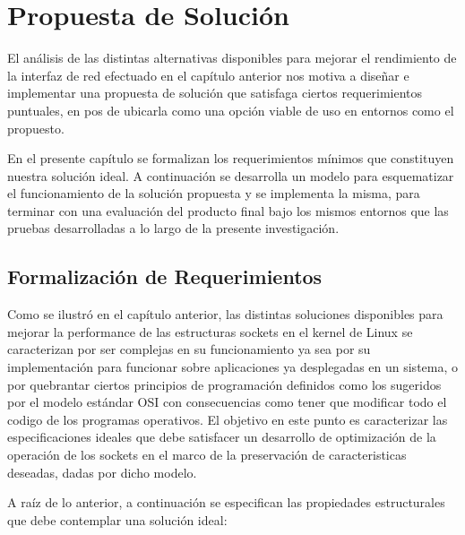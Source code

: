 \chapter{Propuesta de Solución}
El análisis de las distintas alternativas disponibles para mejorar el rendimiento de la interfaz de red efectuado en el capítulo anterior nos motiva a diseñar e implementar una propuesta de solución que satisfaga ciertos requerimientos puntuales, en pos de ubicarla como una opción viable de uso en entornos como el propuesto.

En el presente capítulo se formalizan los requerimientos mínimos que constituyen nuestra solución ideal. A continuación se desarrolla un modelo para esquematizar el funcionamiento de la solución propuesta y se implementa la misma, para terminar con una evaluación del producto final bajo los mismos entornos que las pruebas desarrolladas a lo largo de la presente investigación.

\section{Formalización de Requerimientos}
Como se ilustró en el capítulo anterior, las distintas soluciones disponibles para mejorar la performance de las estructuras sockets en el kernel de Linux se caracterizan por ser complejas en su funcionamiento ya sea por su implementación para funcionar sobre aplicaciones ya desplegadas en un sistema, o por quebrantar ciertos principios de programación definidos como los sugeridos por el modelo estándar OSI con consecuencias como tener que modificar todo el codigo de los programas operativos. El objetivo en este punto es caracterizar las especificaciones ideales que debe satisfacer un desarrollo de optimización de la operación de los sockets en el marco de la preservación de caracteristicas deseadas, dadas por dicho modelo.

A raíz de lo anterior, a continuación se especifican las propiedades estructurales que debe contemplar una solución ideal:


